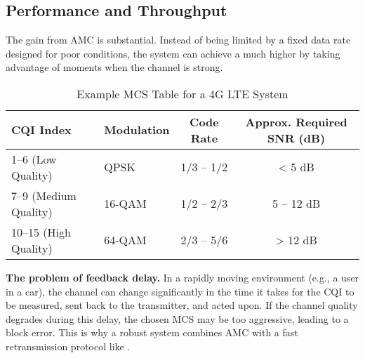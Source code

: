 \subsection{Performance and Throughput}

The gain from AMC is substantial. Instead of being limited by a fixed data rate designed for poor conditions, the system can achieve a much higher  by taking advantage of moments when the channel is strong.

\begin{table}[H]
    \centering
    \caption{Example MCS Table for a 4G LTE System}
    \label{tab:mcs-table}
    \begin{tabular}{@{}llcc@{}}
        \toprule
        \tableheaderfont CQI Index & \tableheaderfont Modulation & \tableheaderfont Code Rate & \tableheaderfont Approx. Required SNR (dB) \\
        \midrule
        1--6 (Low Quality) & QPSK & 1/3 -- 1/2 & < 5 dB \\
        7--9 (Medium Quality) & 16-QAM & 1/2 -- 2/3 & 5 -- 12 dB \\
        10--15 (High Quality) & 64-QAM & 2/3 -- 5/6 & > 12 dB \\
        \bottomrule
    \end{tabular}
\end{table}

\begin{warningbox}
    \textbf{The problem of feedback delay.} In a rapidly moving environment (e.g., a user in a car), the channel can change significantly in the time it takes for the CQI to be measured, sent back to the transmitter, and acted upon. If the channel quality degrades during this delay, the chosen MCS may be too aggressive, leading to a block error. This is why a robust system combines AMC with a fast retransmission protocol like .
\end{warningbox}


